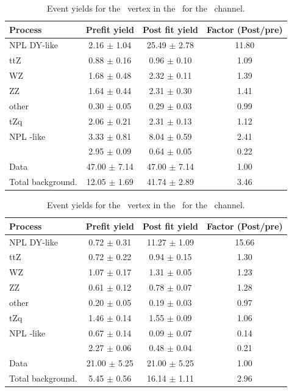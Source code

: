\begin{table}[htbp]
	\centering
	\caption{Event yields for the \Zut\ vertex in the \STSR\  for the \emumu\ channel. }
	\begin{tabular} {l c c c }
		\toprule
		Process & Prefit yield & Post fit yield & Factor (Post/pre) \\
		\midrule
		NPL DY-like & 2.16 $ \pm $ 1.04 & 25.49 $ \pm $ 2.78 & 11.80 \\ 
		ttZ & 0.88 $ \pm $ 0.16 & 0.96 $ \pm $ 0.10 & 1.09 \\ 
		WZ & 1.68 $ \pm $ 0.48 & 2.32 $ \pm $ 0.11 & 1.39 \\ 
		ZZ & 1.64 $ \pm $ 0.44 & 2.31 $ \pm $ 0.30 & 1.41 \\ 
		other & 0.30 $ \pm $ 0.05 & 0.29 $ \pm $ 0.03 & 0.99 \\ 
		tZq & 2.06 $ \pm $ 0.21 & 2.31 $ \pm $ 0.13 & 1.12 \\ 
		NPL \ttbar-like & 3.33 $ \pm $ 0.81 & 8.04 $ \pm $ 0.59 & 2.41\\
		\kZut  & 2.95 $ \pm $ 0.09 & 0.64 $ \pm $ 0.05 & 0.22\\
		\hdashline
		Data & 47.00 $ \pm $ 7.14 & 47.00 $ \pm $ 7.14 & 1.00\\
		Total background. & 12.05 $ \pm $ 1.69 & 41.74 $ \pm $ 2.89 & 3.46\\
		\bottomrule
	\end{tabular}
\end{table}
\begin{table}[htbp]
	\centering
	\caption{Event yields for the \Zut\ vertex in the \STSR\  for the \eemu\ channel. }
	\begin{tabular} {l c c c }
		\toprule
		Process & Prefit yield & Post fit yield & Factor (Post/pre) \\
		\midrule
		NPL DY-like & 0.72 $ \pm $ 0.31 & 11.27 $ \pm $ 1.09 & 15.66 \\ 
		ttZ & 0.72 $ \pm $ 0.22 & 0.94 $ \pm $ 0.15 & 1.30 \\ 
		WZ & 1.07 $ \pm $ 0.17 & 1.31 $ \pm $ 0.05 & 1.23 \\ 
		ZZ & 0.61 $ \pm $ 0.12 & 0.78 $ \pm $ 0.07 & 1.28 \\ 
		other & 0.20 $ \pm $ 0.05 & 0.19 $ \pm $ 0.03 & 0.97 \\ 
		tZq & 1.46 $ \pm $ 0.14 & 1.55 $ \pm $ 0.09 & 1.06 \\ 
		NPL \ttbar-like & 0.67 $ \pm $ 0.14 & 0.09 $ \pm $ 0.07 & 0.14\\
		\kZut  & 2.27 $ \pm $ 0.06 & 0.48 $ \pm $ 0.04 & 0.21\\
		\hdashline
		Data & 21.00 $ \pm $ 5.25 & 21.00 $ \pm $ 5.25 & 1.00\\
		Total background. & 5.45 $ \pm $ 0.56 & 16.14 $ \pm $ 1.11 & 2.96\\
		\bottomrule
	\end{tabular}
\end{table}
